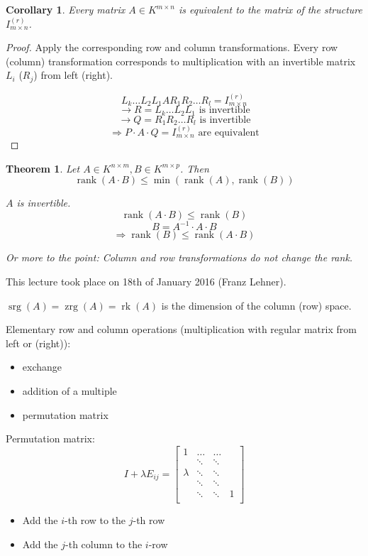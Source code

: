 \documentclass[a4paper,landscape,twocolumn]{article}
\newcommand\meta[3]{This #1 took place on #2 (#3).\par}
\newtheorem{theorem}{Theorem}
\newtheorem{cor}{Corollary}
\DeclareMathOperator\rank{rank} %
\begin{document}
\begin{cor}
  Every matrix $A \in K^{m\times n}$ is equivalent to the matrix of the structure
  $I_{m \times n}^{(r)}$.
\end{cor}
\begin{proof}
  Apply the corresponding row and column transformations.
  Every row (column) transformation corresponds to multiplication with an invertible matrix $L_i$ ($R_j$) from left (right).

  \[ L_k \ldots L_2 L_1 A R_1 R_2 \ldots R_l = I_{m\times n}^{(r)} \]
  \[ \rightarrow R = L_k \ldots L_2 L_1 \text{ is invertible} \]
  \[ \rightarrow Q = R_1 R_2 \ldots R_l \text{ is invertible} \]
  \[ \Rightarrow P \cdot A \cdot Q = I_{m\times n}^{(r)} \text{ are equivalent} \]
\end{proof}

\begin{theorem}
  Let $A \in K^{n \times m}, B \in K^{m\times p}$. Then
  \[ \rank(A \cdot B) \leq \min(\rank(A), \rank(B)) \]

  $A$ is invertible.
  \[ \rank(A \cdot B) \leq \rank(B) \]
  \[ B = A^{-1} \cdot A \cdot B \]
  \[ \Rightarrow \rank(B) \leq \rank(A \cdot B) \]

  Or more to the point: Column and row transformations do not change the rank.
\end{theorem}

\meta{lecture}{18th of January 2016}{Franz Lehner}

$\operatorname{srg}(A) = \operatorname{zrg}(A) = \operatorname{rk}(A)$
is the dimension of the column (row) space.

Elementary row and column operations (multiplication with regular matrix from left or (right)):
\begin{itemize}
  \item exchange
  \item addition of a multiple
  \item permutation matrix
\end{itemize}

Permutation matrix:
\[
  I + \lambda E_{ij} =
  \begin{bmatrix}
    1 & \ldots & \ldots & \\
      & \ddots & \ddots & \\
    \lambda & \ddots & \ddots & \\
      & \ddots & \ddots & \\
      & \ddots & \ddots & 1 \\
  \end{bmatrix}
\]
\begin{itemize}
  \item Add the $i$-th row to the $j$-th row
  \item Add the $j$-th column to the $i$-row
\end{itemize}
\end{document}
